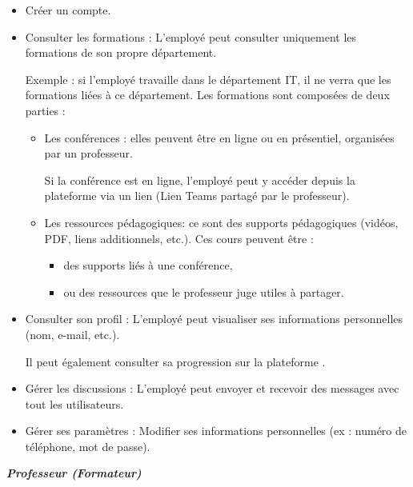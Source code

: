 \documentclass{article}
\begin{document}
\begin{itemize}
    \item Créer un compte.
    \item Consulter les formations :  L’employé peut consulter uniquement les formations de son propre département.

Exemple : si l’employé travaille dans le département IT, il ne verra que les formations liées à ce département.
Les formations sont composées de deux parties :
\begin{itemize}
    \item Les conférences : elles peuvent être en ligne ou en présentiel, organisées par un professeur.
    
Si la conférence est en ligne, l’employé peut y accéder depuis la plateforme via un lien (Lien Teams partagé par le professeur).

    \item Les ressources pédagogiques: ce sont des supports pédagogiques (vidéos, PDF, liens additionnels, etc.). Ces cours peuvent être :
    \begin{itemize}
        \item des supports liés à une conférence,
        \item ou des ressources que le professeur juge utiles à partager.
    \end{itemize}
\end{itemize}
    


\item Consulter son profil :
L’employé peut visualiser ses informations personnelles (nom, e-mail, etc.).

Il peut également consulter sa progression sur la plateforme .












\item Gérer les discussions :
L’employé peut envoyer et recevoir des messages avec tout les utilisateurs.





\item Gérer ses paramètres : Modifier ses informations personnelles (ex : numéro de téléphone, mot de passe).


\end{itemize}
\newpage
\begin{center}
     \textbf{\textit{Professeur (Formateur)}}
\end{center}
\end{document}
